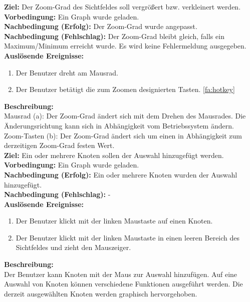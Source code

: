 \label{fa:zoom}
\textbf{Ziel:} Der Zoom-Grad des Sichtfeldes soll vergrößert bzw. verkleinert werden.\\
\textbf{Vorbedingung:} Ein Graph wurde geladen.\\
\textbf{Nachbedingung (Erfolg):} Der Zoom-Grad wurde angepasst.\\
\textbf{Nachbedingung (Fehlschlag):} Der Zoom-Grad bleibt gleich, falls ein Maximum/Minimum erreicht wurde. Es wird keine Fehlermeldung ausgegeben.\\
\textbf{Auslösende Ereignisse:}
\begin{enumerate}[nolistsep, label=(\alph*)]
  \item Der Benutzer dreht am Mausrad.
  \item Der Benutzer betätigt die zum Zoomen designierten Tasten. \ref{fa:hotkey}
\end{enumerate}
\textbf{Beschreibung:}\\
Mausrad (a): Der Zoom-Grad ändert sich mit dem Drehen des Mausrades. Die Änderungsrichtung kann sich in Abhängigkeit vom Betriebssystem ändern.\\
Zoom-Tasten (b): Der Zoom-Grad ändert sich um einen in Abhängigkeit zum derzeitigen Zoom-Grad festen Wert.\\

\label{fa:selekt_knoten}
\textbf{Ziel:} Ein oder mehrere Knoten sollen der Auswahl hinzugefügt werden.\\
\textbf{Vorbedingung:} Ein Graph wurde geladen.\\
\textbf{Nachbedingung (Erfolg):} Ein oder mehrere Knoten wurden der Auswahl hinzugefügt.\\
\textbf{Nachbedingung (Fehlschlag):} -\\
\textbf{Auslösende Ereignisse:}
\begin{enumerate}[nolistsep, label=(\alph*)]
  \item Der Benutzer klickt mit der linken Maustaste auf einen Knoten.
  \item Der Benutzer klickt mit der linken Maustaste in einen leeren Bereich des Sichtfeldes und zieht den Mauszeiger.
\end{enumerate}
\textbf{Beschreibung:}\\
Der Benutzer kann Knoten mit der Maus zur Auswahl hinzufügen.
Auf eine Auswahl von Knoten können verschiedene Funktionen ausgeführt werden. %
Die derzeit ausgewählten Knoten werden graphisch hervorgehoben.\\


